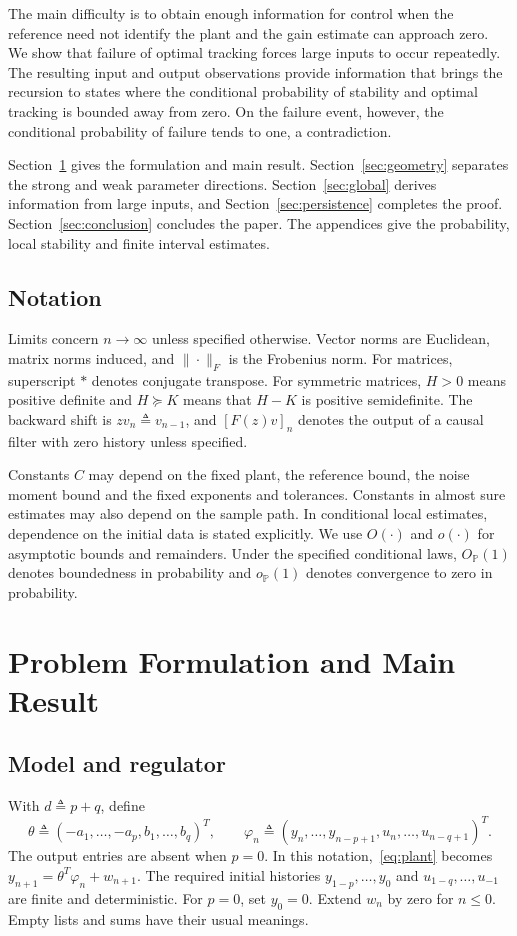 \documentclass[11pt,reqno]{amsart}
\numberwithin{equation}{section}
\theoremstyle{definition}
\theoremstyle{remark}
\newcommand{\Prob}{\mathbb P}
\newcommand{\ph}{\varphi}
\begin{document}
The main difficulty is to obtain enough information for control when the reference need not identify the plant and the gain estimate can approach zero. We show that failure of optimal tracking forces large inputs to occur repeatedly. The resulting input and output observations provide information that brings the recursion to states where the conditional probability of stability and optimal tracking is bounded away from zero. On the failure event, however, the conditional probability of failure tends to one, a contradiction.

Section~\ref{sec:model} gives the formulation and main result. Section~\ref{sec:geometry} separates the strong and weak parameter directions. Section~\ref{sec:global} derives information from large inputs, and Section~\ref{sec:persistence} completes the proof. Section~\ref{sec:conclusion} concludes the paper. The appendices give the probability, local stability and finite interval estimates.

\subsection{Notation}
Limits concern $n\to\infty$ unless specified otherwise. Vector norms are Euclidean, matrix norms induced, and $\|\cdot\|_F$ is the Frobenius norm. For matrices, superscript $*$ denotes conjugate transpose. For symmetric matrices, $H>0$ means positive definite and $H\succeq K$ means that $H-K$ is positive semidefinite. The backward shift is $zv_n\triangleq v_{n-1}$, and $[F(z)v]_n$ denotes the output of a causal filter with zero history unless specified.

Constants $C$ may depend on the fixed plant, the reference bound, the noise moment bound and the fixed exponents and tolerances. Constants in almost sure estimates may also depend on the sample path. In conditional local estimates, dependence on the initial data is stated explicitly. We use $O(\cdot)$ and $o(\cdot)$ for asymptotic bounds and remainders. Under the specified conditional laws, $O_{\Prob}(1)$ denotes boundedness in probability and $o_{\Prob}(1)$ denotes convergence to zero in probability.

\section{Problem Formulation and Main Result}\label{sec:model}
\subsection{Model and regulator}
With $d\triangleq p+q$, define
\begin{equation}\label{eq:regressor}
 \theta\triangleq (-a_1,\ldots,-a_p,b_1,\ldots,b_q)^T,\qquad
 \ph_n\triangleq (y_n,\ldots,y_{n-p+1},u_n,\ldots,u_{n-q+1})^T.
\end{equation}
The output entries are absent when $p=0$. In this notation,~\eqref{eq:plant} becomes
$y_{n+1}=\theta^T\ph_n+w_{n+1}$.
The required initial histories $y_{1-p},\ldots,y_0$ and $u_{1-q},\ldots,u_{-1}$ are finite and deterministic. For $p=0$, set $y_0=0$. Extend $w_n$ by zero for $n\le0$. Empty lists and sums have their usual meanings.
\end{document}
